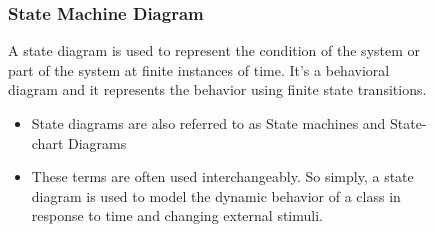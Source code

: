 \begin{figure}[h!]
    \subsubsection*{State Machine Diagram}
    \label{subsubsec:state-machine-diagram}

    \centering
    \begin{minipage}[t]{0.45\textwidth}
        A state diagram is used to represent the condition of the system or part of the system at finite instances of time. It’s a behavioral diagram and it represents the behavior using finite state transitions.

        \begin{itemize}
            \item State diagrams are also referred to as State machines and State-chart Diagrams
            \item These terms are often used interchangeably. So simply, a state diagram is used to model the dynamic behavior of a class in response to time and changing external stimuli.
        \end{itemize}
    \end{minipage}
    \hfill
    \begin{minipage}[t]{0.5\textwidth}
        \vspace{0pt}

\end{minipage}
\end{figure}
